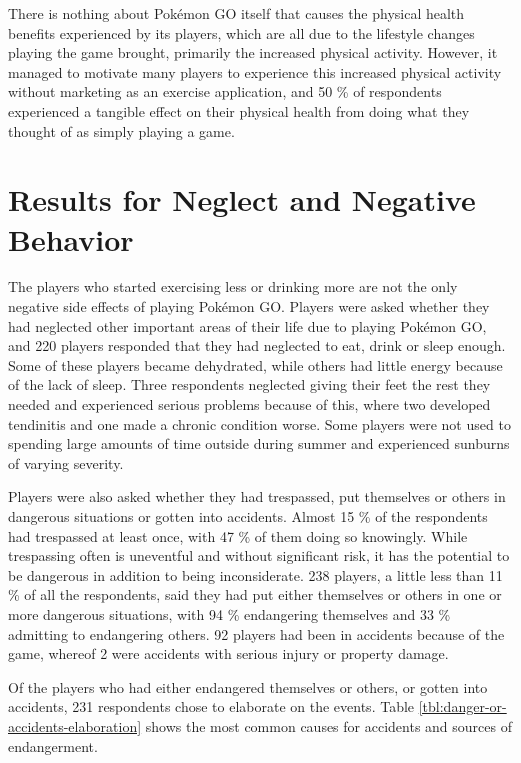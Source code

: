There is nothing about Pokémon GO itself that causes the physical health benefits experienced by its players, which are all due to the lifestyle changes playing the game brought, primarily the increased physical activity. However, it managed to motivate many players to experience this increased physical activity without marketing as an exercise application, and 50 \% of respondents experienced a tangible effect on their physical health from doing what they thought of as simply playing a game. 


\section{Results for Neglect and Negative Behavior}

The players who started exercising less or drinking more are not the only negative side effects of playing Pokémon GO. Players were asked whether they had neglected other important areas of their life due to playing Pokémon GO, and 220 players responded that they had neglected to eat, drink or sleep enough. Some of these players became dehydrated, while others had little energy because of the lack of sleep. Three respondents neglected giving their feet the rest they needed and experienced serious problems because of this, where two developed tendinitis and one made a chronic condition worse. Some players were not used to spending large amounts of time outside during summer and experienced sunburns of varying severity.

Players were also asked whether they had trespassed, put themselves or others in dangerous situations or gotten into accidents. Almost 15 \% of the respondents had trespassed at least once, with 47 \% of them doing so knowingly. While trespassing often is uneventful and without significant risk, it has the potential to be dangerous in addition to being inconsiderate. 238 players, a little less than 11 \% of all the respondents, said they had put either themselves or others in one or more dangerous situations, with 94 \% endangering themselves and 33 \% admitting to endangering others. 92 players had been in accidents because of the game, whereof 2 were accidents with serious injury or property damage.

Of the players who had either endangered themselves or others, or gotten into accidents, 231 respondents chose to elaborate on the events. Table \ref{tbl:danger-or-accidents-elaboration} shows the most common causes for accidents and sources of endangerment.

